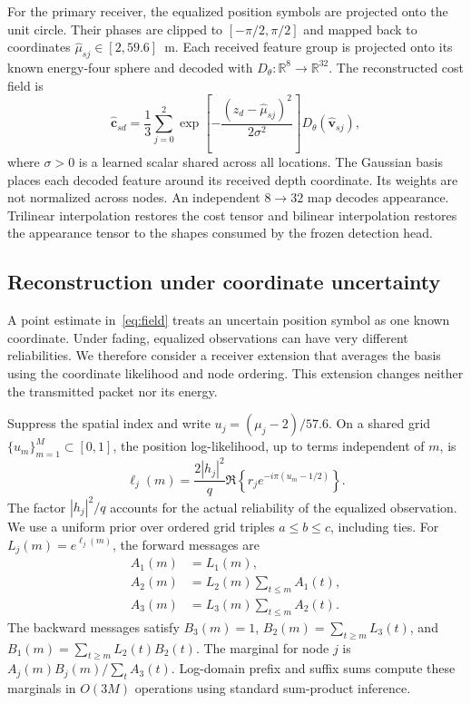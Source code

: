 \documentclass[conference]{IEEEtran}
\begin{document}
For the primary receiver, the equalized position symbols are projected
onto the unit circle. Their phases are clipped to $[-\pi/2,\pi/2]$ and
mapped back to coordinates $\widehat\mu_{sj}\in[2,59.6]$~m.
Each received feature group is projected onto its known energy-four sphere
and decoded with $D_\theta:\mathbb R^8\to\mathbb R^{32}$. The reconstructed
cost field is
\begin{equation}
 \widehat{\mathbf c}_{sd}=\frac{1}{3}\sum_{j=0}^{2}
 \exp\!\left[-\frac{(z_d-\widehat\mu_{sj})^2}{2\sigma^2}\right]
 D_\theta(\widehat{\mathbf v}_{sj}),
 \label{eq:field}
\end{equation}
where $\sigma>0$ is a learned scalar shared across all locations. The
Gaussian basis places each decoded feature around its received depth
coordinate. Its weights are not normalized across nodes. An independent
$8\!\to\!32$ map decodes appearance. Trilinear interpolation restores the
cost tensor and bilinear interpolation restores the appearance tensor to
the shapes consumed by the frozen detection head.

\subsection{Reconstruction under coordinate uncertainty}
A point estimate in~\eqref{eq:field} treats an uncertain position symbol
as one known coordinate. Under fading, equalized observations can have
very different reliabilities. We therefore consider a receiver extension
that averages the basis using the coordinate likelihood and node ordering.
This extension changes neither the transmitted packet nor its energy.

Suppress the spatial index and write $u_j=(\mu_j-2)/57.6$. On a shared
grid $\{u_m\}_{m=1}^M\subset[0,1]$, the position log-likelihood,
up to terms independent of $m$, is
\begin{equation}
 \ell_j(m)=\frac{2|h_j|^2}{q}
 \Re\!\left\{r_j e^{-i\pi(u_m-1/2)}\right\}.
 \label{eq:likelihood}
\end{equation}
The factor $|h_j|^2/q$ accounts for the actual reliability of the equalized
observation. We use a uniform prior over ordered grid triples
$a\le b\le c$, including ties. For $L_j(m)=e^{\ell_j(m)}$, the forward
messages are
\begin{align}
 A_1(m)&=L_1(m),\nonumber\\
 A_2(m)&=L_2(m)\sum_{t\le m}A_1(t),\nonumber\\
 A_3(m)&=L_3(m)\sum_{t\le m}A_2(t).
 \label{eq:forward}
\end{align}
The backward messages satisfy $B_3(m)=1$,
$B_2(m)=\sum_{t\ge m}L_3(t)$, and
$B_1(m)=\sum_{t\ge m}L_2(t)B_2(t)$. The marginal for node $j$ is
$A_j(m)B_j(m)/\sum_t A_3(t)$. Log-domain prefix and suffix sums compute
these marginals in $O(3M)$ operations using standard sum-product inference.
\end{document}
